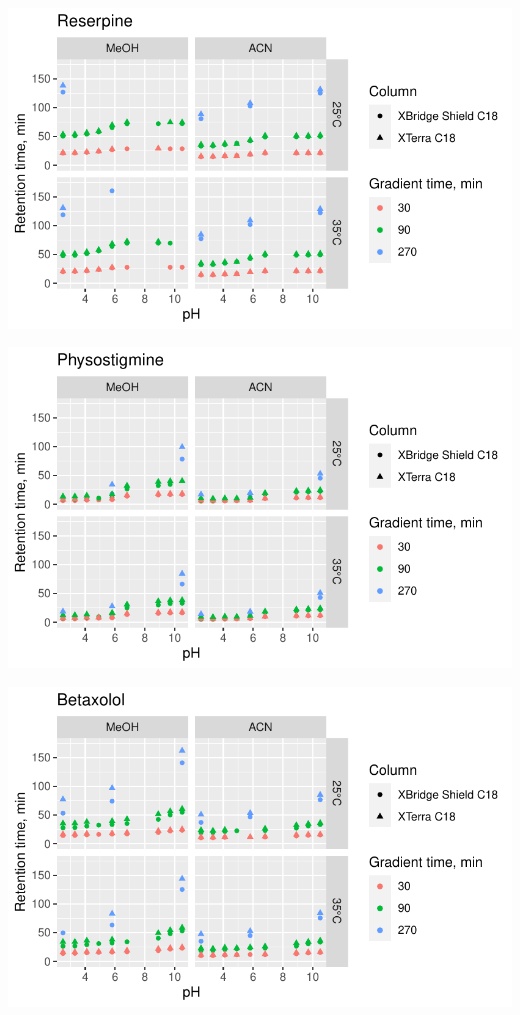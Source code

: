 \documentclass[
  letterpaper,
  DIV=11,
  numbers=noendperiod]{scrreprt}
\begin{document}
\includegraphics{index_files/figure-pdf/unnamed-chunk-4-51.pdf}

\includegraphics{index_files/figure-pdf/unnamed-chunk-4-52.pdf}

\includegraphics{index_files/figure-pdf/unnamed-chunk-4-53.pdf}
\end{document}
